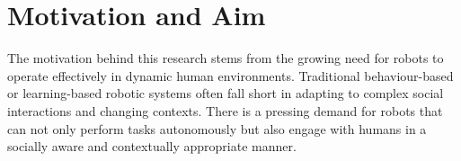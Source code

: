 \section{Motivation and Aim}
\label{sec::MotivationAndAim}

The motivation behind this research stems from the growing need for robots to operate effectively in dynamic human environments. Traditional behaviour-based or learning-based robotic systems often fall short in adapting to complex social interactions and changing contexts. There is a pressing demand for robots that can not only perform tasks autonomously but also engage with humans in a socially aware and contextually appropriate manner.